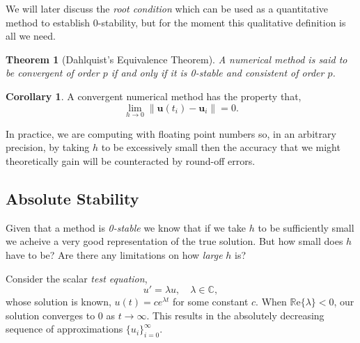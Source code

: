 \documentclass[12pt, twoside]{report}
\theoremstyle{plain}
\newtheorem{theorem}{Theorem}[chapter]
\theoremstyle{definition}
\newtheorem{corollary}{Corollary}[theorem]
\theoremstyle{definition}
\providecommand{\norm}[1]{\lVert#1\rVert}
\begin{document}
        We will later discuss the \textit{root condition} which can be used as
        a quantitative method to establish 0-stability, but for the moment this
        qualitative definition is all we need.

        \begin{theorem}[Dahlquist's Equivalence Theorem]
        \label{2_dahlquist}
            A numerical method is said to be convergent of order $p$ if and 
            only if it is 0-stable and consistent of order $p$.
        \end{theorem}

        \begin{corollary}
        \label{2_dahlquist_corollary}
            A convergent numerical method has the property that,
            \begin{equation}
                \lim_{h \to 0} \norm{\mathbf{u}(t_i) - \mathbf{u}_i} = 0.
            \end{equation}
        \end{corollary}

        In practice, we are computing with floating point numbers so, in an 
        arbitrary precision, by taking $h$ to be excessively small then the 
        accuracy that we might theoretically gain will be counteracted by round-off errors.
        

        \subsection{Absolute Stability}
        \label{2_absolute_stability}
            Given that a method is \textit{0-stable} we know that if we take 
            $h$ to be sufficiently small we acheive a very good representation
            of the true solution. But how small does $h$ have to be? Are there any limitations on how \textit{large} $h$ is?

            Consider the scalar \textit{test equation},
            \begin{equation}
            \label{2_test_equation}
                u' = \lambda u, \quad \lambda \in \mathbb{C},
            \end{equation}
            whose solution is known, $u(t)=c e^{\lambda t}$ for some constant 
            $c$. When $\mathbb{R}\text{e}\{\lambda\} < 0$, our solution 
            converges to 0 as $t\to\infty$. This results in the absolutely 
            decreasing sequence of approximations 
            ${\lbrace u_i \rbrace}_{i=0}^{\infty}$.
\end{document}
